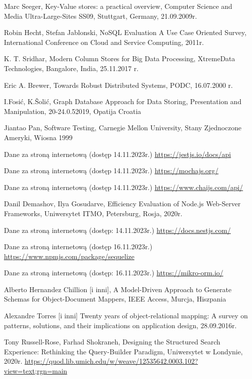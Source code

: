 \documentclass[12pt, a4paper, twoside, openany]{book}
\begin{document}
\begin{enumerate}[label={[}\arabic*{]}]
    \item Marc Seeger, Key-Value stores: a practical overview, Computer Science and Media Ultra-Large-Sites SS09, Stuttgart, Germany, 21.09.2009r.
    \item Robin Hecht, Stefan Jablonski, NoSQL Evaluation A Use Case Oriented Survey, International Conference on Cloud and Service Computing, 2011r.
    \item K. T. Sridhar, Modern Column Stores for Big Data Processing, XtremeData Technologies, Bangalore, India, 25.11.2017 r.
    \item Eric A. Brewer, Towards Robust Distributed Systems, PODC, 16.07.2000 r.
    \item I.Fosić, K.Šolić, Graph Database Approach for Data Storing, Presentation and Manipulation, 20-24.0.52019, Opatija Croatia
    \item Jiantao Pan, Software Testing, Carnegie Mellon University, Stany Zjednoczone Ameryki, Wiosna 1999
    \item Dane za stroną internetową (dostęp 14.11.2023r.) \url{https://jestjs.io/docs/api}
    \item Dane za stroną internetową (dostęp 14.11.2023r.) \url{https://mochajs.org/}
    \item Dane za stroną internetową (dostęp 14.11.2023r.) \url{https://www.chaijs.com/api/}
    \item Danil Demashov, Ilya Gosudarve, Efficiency Evaluation of Node.js Web-Server Frameworks, Uniwersytet ITMO, Petersburg, Rosja, 2020r.
    \item Dane za stroną internetową (dostęp: 14.11.2023r.) \url{https://docs.nestjs.com/}
    \item Dane za stroną internetową (dostęp 16.11.2023r.) \url{https://www.npmjs.com/package/sequelize}
    \item Dane za stroną internetową (dostęp: 16.11.2023r.) \url{https://mikro-orm.io/}
    \item Alberto Hernandez Chillion [i inni], A Model-Driven Approach to Generate Schemas for Object-Document Mappers, IEEE Access, Murcja, Hiszpania
    \item Alexandre Torres [i inni] Twenty years of object-relational mapping: A survey on patterns, solutions, and their implications on application design, 28.09.2016r.
    \item Tony Russell-Rose, Farhad Shokraneh, Designing the Structured Search Experience: Rethinking the Query-Builder Paradigm, Uniwersytet w Londynie, 2020r. \url{https://quod.lib.umich.edu/w/weave/12535642.0003.102?view=text;rgn=main}

\end{enumerate}
\end{document}
